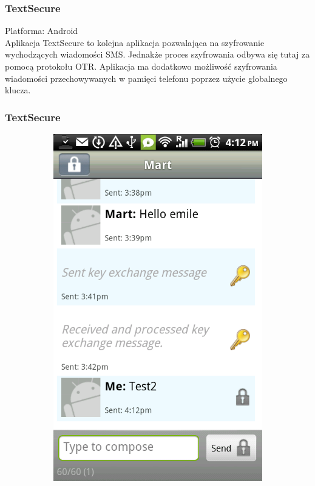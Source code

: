 \documentclass[xcolor=table]{beamer}
\begin{document}
\begin{frame}
  \frametitle{TextSecure}
	
	Platforma: Android\\
	Aplikacja TextSecure to kolejna aplikacja pozwalająca na szyfrowanie 
	wychodzących wiadomości SMS. Jednakże proces szyfrowania odbywa się tutaj 
	za pomocą protokołu OTR. Aplikacja ma dodatkowo możliwość szyfrowania 
	wiadomości przechowywanych w pamięci telefonu poprzez użycie globalnego klucza.
		
\end{frame}
\begin{frame}
  \frametitle{TextSecure}
    \begin{center}
        \begin{figure}
          \centering
            \begin{subfigure}[b]{0.4\textwidth}
               \centering
               \includegraphics[width=\textwidth]{textsecure1}

\end{subfigure}
\end{figure}
\end{center}
\end{frame}
\end{document}
